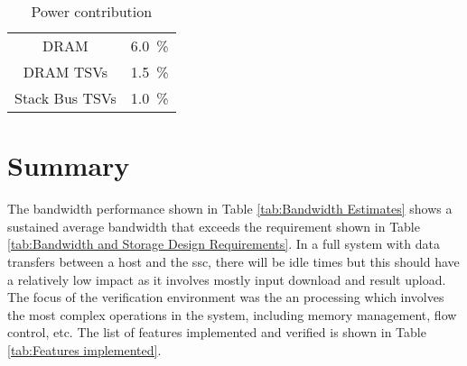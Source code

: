 \begin{table}[h]
\begin{subtable}{0.75\textwidth}
\begin{adjustbox}{width=0.55\textwidth}
\begin{tabular}{|c|c|}
                   DRAM  & \SI[per-mode=symbol]{ 6.0}{\percent}  \\
              DRAM TSVs  & \SI[per-mode=symbol]{ 1.5}{\percent}  \\
         Stack Bus TSVs  & \SI[per-mode=symbol]{ 1.0}{\percent}  \\
        \hline
      \end{tabular}
    \end{adjustbox}
    \vspace{3pt}
    \captionsetup{justification=centering, skip=10pt}
    \caption{Power contribution}
    \label{tab:Power Dissipation}
  \end{subtable}
  \end{table}


\section{Summary}
\label{sec:Results summary}

The bandwidth performance shown in Table \ref{tab:Bandwidth Estimates} shows a sustained average bandwidth that exceeds the requirement shown in Table \ref{tab:Bandwidth and Storage Design Requirements}.
In a full system with data transfers between a host and the \ac{ssc}, there will be idle times but this should have a relatively low impact as it involves mostly input download and result upload.
The focus of the verification environment was the \ac{an} processing which involves the most complex operations in the system, including memory management, flow control, etc.
The list of features implemented and verified is shown in Table \ref{tab:Features implemented}.

